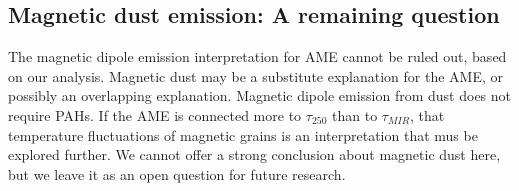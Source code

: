 \subsection{Magnetic dust emission: A remaining question}
     The magnetic dipole emission interpretation for AME cannot be ruled out, based on our analysis. Magnetic dust may be a substitute explanation for the AME, or possibly an overlapping explanation. Magnetic dipole emission from dust does not require PAHs. If the AME is connected more to $\tau_{250}$ than to $\tau_{MIR}$, that temperature fluctuations of magnetic grains is an interpretation that mus be explored further. We cannot offer a strong conclusion about magnetic dust here, but we leave it as an open question for future research.
